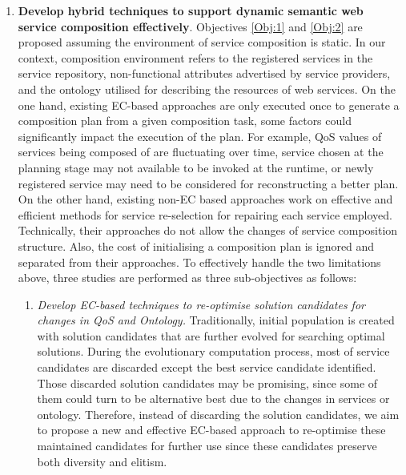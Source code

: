 \begin{enumerate}
\begin{enumerate}
   \end{enumerate}
   
\vspace{0.5cm}
 \item \textbf{Develop hybrid techniques to support dynamic semantic web service composition effectively}. Objectives \ref{Obj:1} and \ref{Obj:2} are proposed assuming the environment of service composition is static. In our context, composition environment refers to the registered services in the service repository, non-functional attributes advertised by service providers, and the ontology utilised for describing the resources of web services. On the one hand, existing EC-based approaches are only executed once to generate a composition plan from a given composition task, some factors could significantly impact the execution of the plan. For example, QoS values of services being composed of are fluctuating over time, service chosen at the planning stage may not available to be invoked at the runtime, or newly registered service may need to be considered for reconstructing a better plan. On the other hand, existing non-EC based approaches \cite{nasridinov2012qos,salas2006ws,wagner2016robust,yin2010qos} work on effective and efficient methods for service re-selection for repairing each service employed. Technically, their approaches do not allow the changes of service composition structure. Also, the cost of initialising a composition plan is ignored and separated from their approaches. To effectively handle the two limitations above, three studies are performed as three sub-objectives as follows:

  \begin{enumerate}
 \item \label{Obj:3.1} \emph{Develop EC-based techniques to re-optimise solution candidates for changes in QoS and Ontology.} Traditionally, initial population is created with solution candidates that are further evolved for searching optimal solutions. During the evolutionary computation process, most of service candidates are discarded except the best service candidate identified. Those discarded solution candidates may be promising, since some of them could turn to be alternative best due to the changes in services or ontology. Therefore, instead of discarding the solution candidates, we aim to propose a new and effective EC-based approach to re-optimise these maintained candidates for further use since these candidates preserve both diversity and elitism. 


\end{enumerate}
\end{enumerate}
